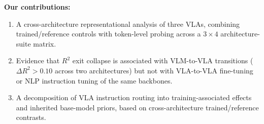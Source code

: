 \noindent\textbf{Our contributions:}
\begin{enumerate}[nosep]
\item A cross-architecture representational analysis of three VLAs, combining trained/reference controls with token-level probing across a $3 \times 4$ architecture-suite matrix.
\item Evidence that $R^2$ exit collapse is associated with VLM-to-VLA transitions ($\Delta R^2 > 0.10$ across two architectures) but not with VLA-to-VLA fine-tuning or NLP instruction tuning of the same backbones.
\item A decomposition of VLA instruction routing into training-associated effects and inherited base-model priors, based on cross-architecture trained/reference contrasts.
\end{enumerate}
